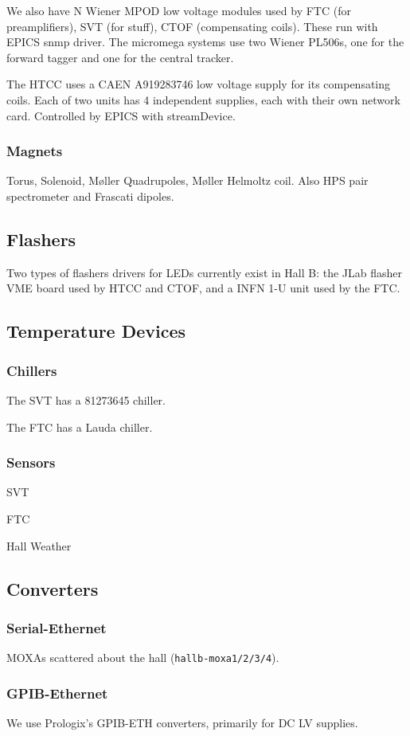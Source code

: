 \documentclass[amsmath,amssymb,notitlepage,11pt]{revtex4}
\begin{document}
We also have N Wiener MPOD low voltage modules used by FTC (for preamplifiers), SVT (for stuff), CTOF (compensating coils).  These run with EPICS snmp driver.  The micromega systems use two Wiener PL506s, one for the forward tagger and one for the central tracker.

The HTCC uses a CAEN A919283746 low voltage supply for its compensating coils.  Each of two units has 4 independent supplies, each with their own network card.  Controlled by EPICS with streamDevice.

\subsubsection{Magnets}
Torus, Solenoid, M\o ller Quadrupoles, M\o ller Helmoltz coil.  Also HPS pair spectrometer and Frascati dipoles.

\subsection{Flashers}
Two types of flashers drivers for LEDs currently exist in Hall B:  the JLab flasher VME board used by HTCC and CTOF, and a INFN 1-U unit used by the FTC.

\subsection{Temperature Devices}
\subsubsection{Chillers}
The SVT has a 81273645 chiller.

The FTC has a Lauda chiller.
\subsubsection{Sensors}
SVT

FTC

Hall Weather

\subsection{Converters}
\subsubsection{Serial-Ethernet}
MOXAs scattered about the hall (\texttt{hallb-moxa1/2/3/4}).
\subsubsection{GPIB-Ethernet}
We use Prologix's GPIB-ETH converters, primarily for DC LV supplies.
\end{document}
